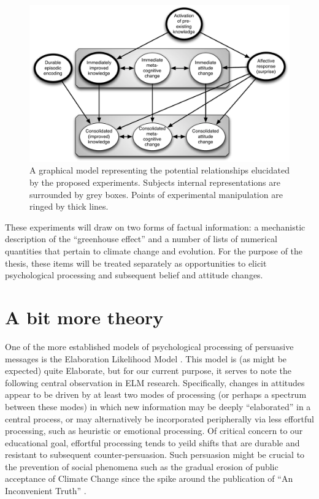 \begin{figure}
\begin{center}
\includegraphics[width=\textwidth]{causal3.pdf}
\end{center}
\caption{A graphical model representing the potential relationships elucidated
    by the proposed experiments. Subjects internal representations are
    surrounded by grey boxes. Points of experimental manipulation are ringed by
    thick lines.}
\label{causal3}
\end{figure}

These experiments will draw on two forms of factual information: a
mechanistic description of the ``greenhouse effect'' and a number of lists of
numerical quantities that pertain to climate change and evolution. For the
purpose of the thesis, these items will be treated separately as opportunities
to elicit psychological processing and subsequent belief and attitude changes.

\section{A bit more theory}

One of the more established models of psychological processing of persuasive
messages is the Elaboration Likelihood Model \cite{petty_elaboration_1999}.
This model is (as might be expected) quite Elaborate, but for our current
purpose, it serves to note the following central observation in ELM research.
Specifically, changes in attitudes appear to be driven by at least two modes of
processing (or perhaps a spectrum between these modes) in which new information
may be deeply ``elaborated'' in a central process, or may alternatively be
incorporated peripherally via less effortful processing, such as heuristic or
emotional processing. Of critical concern to our educational goal, effortful
processing tends to yeild shifts that are durable and resistant to subsequent
counter-persuasion. Such persuasion might be crucial to the prevention of social
phenomena such as the gradual erosion of public acceptance of Climate Change
since the spike around the publication of ``An Inconvenient Truth'' 
\cite{leiserowitz_climate_2010}.

